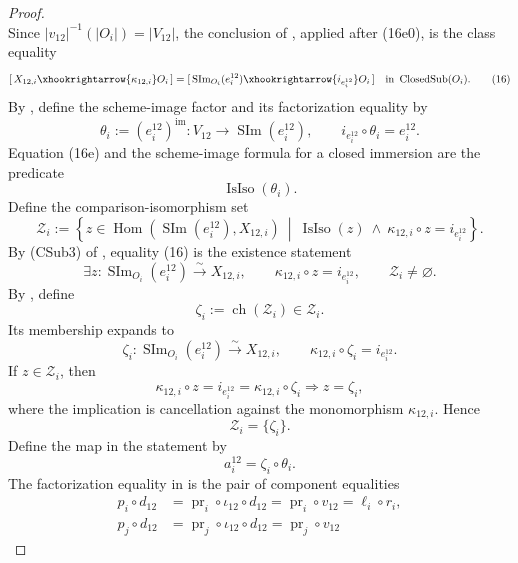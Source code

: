 \begin{proof}
\[  \]
  Since $|v_{12}|^{-1}(|O_i|)=|V_{12}|$, the conclusion of
  , applied after (16e0), is
  the class equality
  \[
    [\,X_{12,i}\xhookrightarrow{\kappa_{12,i}}O_i\,]
      =[\,\operatorname{SIm}_{O_i}(e_i^{12})
          \xhookrightarrow{i_{e_i^{12}}}O_i\,]
      \quad\text{in }\operatorname{ClosedSub}(O_i).              \tag{16}
  \]
  By , define the scheme-image factor
  and its factorization equality by
  \[
    \theta_i:=(e_i^{12})^{\mathrm{im}}
      \colon V_{12}\longrightarrow\operatorname{SIm}(e_i^{12}),
    \qquad
    i_{e_i^{12}}\circ\theta_i=e_i^{12}.                            \tag{16a}
  \]
  Equation (16e) and the scheme-image formula for a closed immersion are the
  predicate
  \[
    \operatorname{IsIso}(\theta_i).
  \]
  Define the comparison-isomorphism set
  \[
    \mathscr Z_i:=\left\{z\in
      \operatorname{Hom}(\operatorname{SIm}(e_i^{12}),X_{12,i})
      \ \middle|\ 
      \operatorname{IsIso}(z)\ \wedge\
      \kappa_{12,i}\circ z=i_{e_i^{12}}\right\}.
  \]
  By (CSub3) of , equality (16) is
  the existence statement
  \[
    \exists z\colon\operatorname{SIm}_{O_i}(e_i^{12})
      \xrightarrow{\sim}X_{12,i},\qquad
      \kappa_{12,i}\circ z=i_{e_i^{12}},
    \qquad
    \mathscr Z_i\neq\varnothing.                                \tag{16f0}
  \]
  By \Cref{def:nagata-choice-notation}, define
  \[
    \zeta_i:=\operatorname{ch}(\mathscr Z_i)
      \in\mathscr Z_i.
  \]
  Its membership expands to
  \[
    \zeta_i\colon\operatorname{SIm}_{O_i}(e_i^{12})
      \xrightarrow{\sim}X_{12,i},\qquad
    \kappa_{12,i}\circ\zeta_i=i_{e_i^{12}}.                     \tag{16f}
  \]
  If $z\in\mathscr Z_i$, then
  \[
    \kappa_{12,i}\circ z=i_{e_i^{12}}
      =\kappa_{12,i}\circ\zeta_i
      \Longrightarrow z=\zeta_i,
  \]
  where the implication is cancellation against the monomorphism
  $\kappa_{12,i}$.  Hence
  \[
    \mathscr Z_i=\{\zeta_i\}.                                    \tag{16f1}
  \]
  Define the map in the statement by
  \[
    a_i^{12}=\zeta_i\circ\theta_i.
  \]
  The factorization equality in
   is the pair of component
  equalities
  \[
  \begin{aligned}
    p_i\circ d_{12}
      &=\operatorname{pr}_i\circ\iota_{12}\circ d_{12}
       =\operatorname{pr}_i\circ v_{12}
       =\ell_i\circ r_i,\\
    p_j\circ d_{12}
      &=\operatorname{pr}_j\circ\iota_{12}\circ d_{12}
       =\operatorname{pr}_j\circ v_{12}

\end{aligned}\]
\end{proof}
